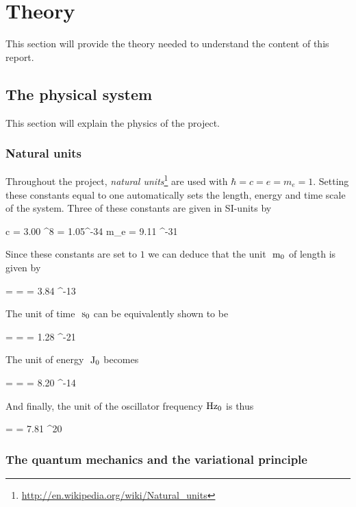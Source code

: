 \section{Theory}\label{sec:theory}
This section will provide the theory needed to understand the content of this report. 


\subsection{The physical system}
This section will explain the physics of the project. 

\subsubsection{Natural units} \label{sec:theory_natural_units}
Throughout the project, \textit{natural units}\footnote{\url{http://en.wikipedia.org/wiki/Natural_units}} are used with $\hbar = c = e = m_e = 1$. 
Setting these constants equal to one automatically sets the length, energy and time scale of the system. 
Three of these constants are given in SI-units by

\eqs
c = 3.00 ^8 \frac{\m}{\s}
\eqf
\eqs
\hbar = 1.05^{-34} 
\eqf
\eqs
m_e = 9.11 ^{-31} \kg
\eqf

Since these constants are set to $1$ we can deduce that the unit $~\textrm{m}_0$ of length is given by 

\eqs
\mn =  =  = 3.84 ^{-13} \m
\eqf

The unit of time $~\textrm{s}_0$ can be equivalently shown to be

\eqs
\sn =  =  = 1.28 ^{-21} \s
\eqf

The unit of energy $~\textrm{J}_0$ becomes

\eqs
\Jn = \frac{\hbar}{\sn} =  = 8.20 ^{-14} \J
\eqf

And finally, the unit of the oscillator frequency$~\textrm{Hz}_0$ is thus

\eqs
\Hzn =  = 7.81 ^{20} \Hz
\eqf

\subsubsection{The quantum mechanics and the variational principle} \label{sec:quantum_mechanics}

